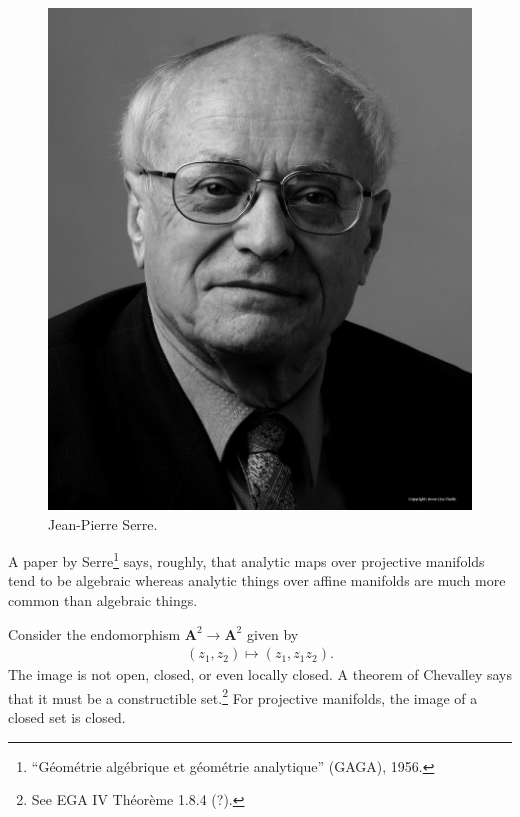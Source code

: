 \documentclass [11 pt, oneside] {article}
\begin{document}
\begin{figure}
\begin{center}
\includegraphics[scale=0.7]{images/serre}
\caption{Jean-Pierre Serre.}
\end{center}
\end{figure}

\begin{remark}
	A paper by Serre\footnote{``G\'eom\'etrie alg\'ebrique et g\'eom\'etrie analytique'' (GAGA), 1956.} says, roughly, that analytic maps over projective manifolds tend to be algebraic whereas analytic things over affine manifolds are much more common than algebraic things.
\end{remark}


\begin{example}\label{}
Consider the endomorphism $\mathbf{A}^2\longrightarrow \mathbf{A}^2$ given by
\begin{align*}
	(z_1,z_2)\longmapsto  (z_1,z_1z_2).
\end{align*}
The image is not open, closed, or even locally closed. A theorem of Chevalley says that it must be a constructible set.\footnote{See EGA IV Th\'eor\`eme 1.8.4 (?).} For projective manifolds, the image of a closed set is closed.
\end{example}
\end{document}

